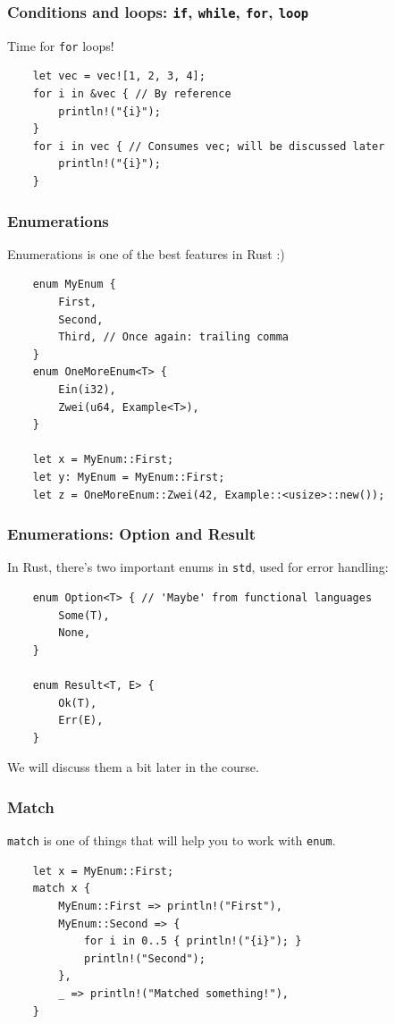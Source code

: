\documentclass[aspectratio=1610,t]{beamer}
\begin{document}

\begin{frame}[fragile]
\frametitle{Conditions and loops: \texttt{if}, \texttt{while}, \texttt{for}, \texttt{loop}}
Time for \texttt{for} loops!

\begin{verbatim}
    let vec = vec![1, 2, 3, 4];
    for i in &vec { // By reference
        println!("{i}");
    }
    for i in vec { // Consumes vec; will be discussed later
        println!("{i}");
    }
\end{verbatim}
\end{frame}


\begin{frame}[fragile]
\frametitle{Enumerations}
Enumerations is one of the best features in Rust :)

\begin{verbatim}
    enum MyEnum {
        First,
        Second,
        Third, // Once again: trailing comma
    }
    enum OneMoreEnum<T> {
        Ein(i32),
        Zwei(u64, Example<T>),
    }

    let x = MyEnum::First;
    let y: MyEnum = MyEnum::First;
    let z = OneMoreEnum::Zwei(42, Example::<usize>::new());
\end{verbatim}
\end{frame}


\begin{frame}[fragile]
\frametitle{Enumerations: Option and Result}
In Rust, there's two important enums in \texttt{std}, used for error handling:

\begin{verbatim}
    enum Option<T> { // 'Maybe' from functional languages
        Some(T),
        None,
    }

    enum Result<T, E> {
        Ok(T),
        Err(E),
    }
\end{verbatim}

We will discuss them a bit later in the course.
\end{frame}


\begin{frame}[fragile]
\frametitle{Match}
\texttt{match} is one of things that will help you to work with \texttt{enum}.

\begin{verbatim}
    let x = MyEnum::First;
    match x {
        MyEnum::First => println!("First"),
        MyEnum::Second => {
            for i in 0..5 { println!("{i}"); }
            println!("Second");
        },
        _ => println!("Matched something!"),
    }
\end{verbatim}
\end{frame}
\end{document}
